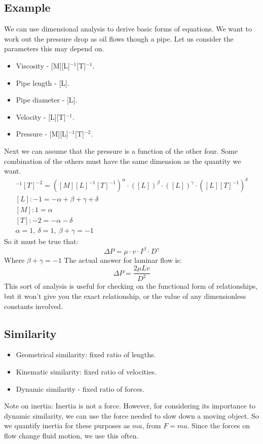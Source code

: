 \subsection{Example}
We can use dimensional analysis to derive basic forms of equations. We want to work out the pressure drop as oil flows though a pipe. Let us consider the parameters this may depend on.
\begin{itemize}[noitemsep]
  \item Viscosity - [M][L]\(^{-1}\)[T]\(^{-1}\).
  \item Pipe length - [L].
  \item Pipe diameter - [L].
  \item Velocity - [L][T]\(^{-1}\).
  \item Pressure - [M][L]\(^{-1}\)[T]\(^{-2}\).
\end{itemize}
Next we can assume that the pressure is a function of the other four. Some combination of the others must have the same dimension as the quantity we want.
\begin{gather}
  [M][L]^{-1}[T]^{-2} = ([M][L]^{-1}[T]^{-1})^\alpha \cdot ([L])^\beta \cdot ([L])^\gamma \cdot ([L][T]^{-1})^\delta \\
  [L]: -1 = -\alpha + \beta + \gamma + \delta\\
  [M]: 1 = \alpha \\
  [T]: -2 = -\alpha -\delta \\
  \alpha =1, \ \delta =1, \ \beta + \gamma = -1
\end{gather}
So it must be true that:
\begin{equation}
  \Delta P = \mu \cdot v \cdot I^{\beta} \cdot D^{\gamma}
\end{equation}
Where \(\beta + \gamma = -1\)
The actual answer for laminar flow is:
\begin{equation}
  \Delta P = \frac{2\mu L v}{D^2}
\end{equation}
This sort of analysis is useful for checking on the functional form of relationships, but it won't give you the exact relationship, or the value of any dimensionless constants involved.
\subsection{Similarity}
\begin{itemize}[noitemsep]
  \item Geometrical similarity: fixed ratio of lengths.
  \item Kinematic similarity: fixed ratio of velocities.
  \item Dynamic similarity - fixed ratio of forces.
\end{itemize}
Note on inertia: Inertia is not a force. However, for considering its importance to dynamic similarity, we can use the force needed to slow down a moving object. So we quantify inertia for these purposes as \(ma\), from \(F = ma\). Since the forces on flow change fluid motion, we use this often.
